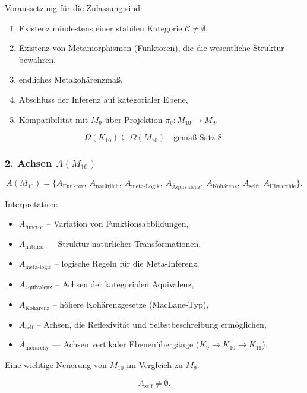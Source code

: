 Voraussetzung für die Zulassung sind:

\begin{enumerate}
    \item Existenz mindestens einer stabilen Kategorie $\mathcal{C}\neq\emptyset$,
    \item Existenz von Metamorphismen (Funktoren), die die wesentliche Struktur bewahren,
    \item endliches Metakohärenzmaß,
    \item Abschluss der Inferenz auf kategorialer Ebene,
    \item Kompatibilität mit $M_9$ über Projektion $\pi_{9}:M_{10}\to M_9$.
\end{enumerate}

\[
\Omega(K_{10})\subseteq\Omega(M_{10}) \quad\text{gemäß Satz 8}.
\]

\subsubsection*{2. Achsen $A(M_{10})$}

\[
A(M_{10}) =
\{
A_{\mathrm{Funktor}},\
A_{\mathrm{natürlich}},\
A_{\mathrm{meta\mbox{-}Logik}},\
A_{\mathrm{Äquivalenz}},\
A_{\mathrm{Kohärenz}},\
A_{\mathrm{self}},\
A_{\mathrm{Hierarchie}}
\}.
\]

Interpretation:

\begin{itemize}
    \item $A_{\mathrm{functor}}$ – Variation von Funktionsabbildungen,
    \item $A_{\mathrm{natural}}$ — Struktur natürlicher Transformationen,
    \item $A_{\mathrm{meta\mbox{-}logic}}$ – logische Regeln für die Meta-Inferenz,
    \item $A_{\mathrm{äquivalenz}}$ – Achsen der kategorialen Äquivalenz,
    \item $A_{\mathrm{Kohärenz}}$ – höhere Kohärenzgesetze (MacLane-Typ),
    \item $A_{\mathrm{self}}$ – Achsen, die Reflexivität und Selbstbeschreibung ermöglichen,
    \item $A_{\mathrm{hierarchy}}$ — Achsen vertikaler Ebenenübergänge ($K_9\to K_{10}\to K_{11}$).
\end{itemize}

Eine wichtige Neuerung von $M_{10}$ im Vergleich zu $M_9$:

\[
A_{\mathrm{self}} \ne \emptyset.
\]

